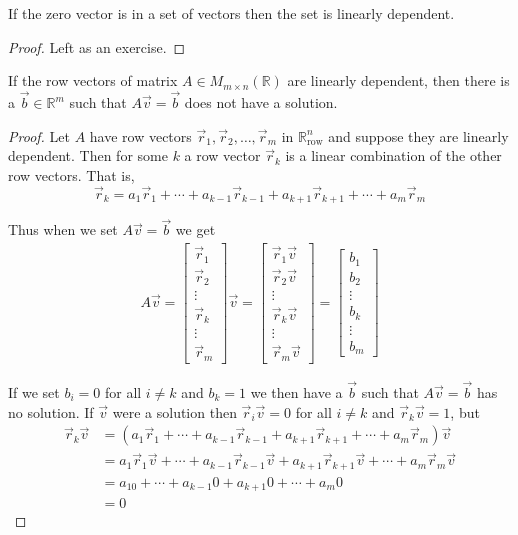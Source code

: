 \begin{proposition}\label{prop:zero_dependent} If the zero vector is in a set of vectors then the set is linearly dependent. 
\end{proposition}
\begin{proof}
Left as an exercise.
\end{proof}


\begin{proposition}\label{prop:not_onto} If the row vectors of matrix $A \in M_{m\times n}(\mathbb{R})$ are linearly dependent, then there is a  $\vec{b} \in \mathbb{R}^m$ such that $A\vec{v}=\vec{b}$ does not have a solution.
\end{proposition}
\begin{proof}
Let $A$ have row vectors $\vec{r}_1, \vec{r}_2, \ldots, \vec{r}_m$ in $\mathbb{R}^n_\text{row}$ and suppose they are linearly dependent. Then for some $k$ a row vector
$\vec{r}_k$ is a linear combination of the other row vectors. That is,
\[
\vec{r}_k=a_1\vec{r}_1+\cdots+a_{k-1}\vec{r}_{k-1}+a_{k+1}\vec{r}_{k+1}+\cdots+a_m\vec{r}_m
\]

Thus when we set $A\vec{v}=\vec{b}$ we get 
\begin{align*}
A\vec{v} = \begin{bmatrix}\vec{r}_1 \\ \vec{r}_2 \\ \vdots \\ \vec{r}_k \\ \vdots \\ \vec{r}_m\end{bmatrix}\vec{v}
= \begin{bmatrix}\vec{r}_1\vec{v} \\ \vec{r}_2\vec{v} \\ \vdots \\ \vec{r}_k\vec{v} \\ \vdots \\ \vec{r}_m\vec{v}\end{bmatrix}
=\begin{bmatrix}b_1 \\ b_2 \\ \vdots \\ b_k \\ \vdots \\ b_m\end{bmatrix}
\end{align*}

If we set $b_i=0$ for all $i \neq k$ and $b_k=1$ we then have a $\vec{b}$ such that $A\vec{v}=\vec{b}$ has no solution. If $\vec{v}$ were a solution  
then $\vec{r}_i\vec{v}=0$  for all $i \neq k$ and $\vec{r}_k\vec{v}=1$, but 
\begin{align*}
\vec{r}_k\vec{v} &= (a_1\vec{r}_1+\cdots+a_{k-1}\vec{r}_{k-1}+a_{k+1}\vec{r}_{k+1}+\cdots+a_m\vec{r}_m)\vec{v}\\
&= a_1\vec{r}_1\vec{v}+\cdots+a_{k-1}\vec{r}_{k-1}\vec{v}+a_{k+1}\vec{r}_{k+1}\vec{v}+\cdots+a_m\vec{r}_m\vec{v}\\
&= a_10+\cdots+a_{k-1}0+a_{k+1}0+\cdots+a_m0\\
&= 0
\end{align*}
\end{proof}


